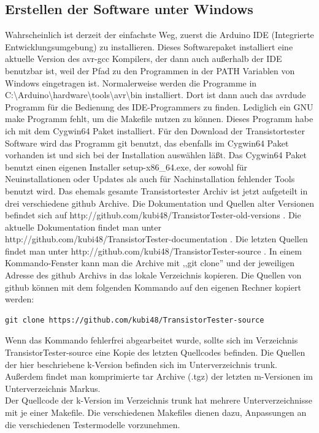 \subsection{Erstellen der Software unter Windows}
Wahrscheinlich ist derzeit der einfachste Weg, zuerst die Arduino IDE (Integrierte Entwicklungsumgebung) zu installieren.
Dieses Softwarepaket installiert eine aktuelle Version des avr-gcc Kompilers, der dann
auch außerhalb der IDE benutzbar ist, weil der Pfad zu den Programmen in der PATH Variablen von Windows eingetragen ist.
Normalerweise werden die Programme in C:\textbackslash Arduino\textbackslash hardware\textbackslash tools\textbackslash avr\textbackslash bin installiert.
Dort ist dann auch das avrdude Programm für die Bedienung des IDE-Programmers zu finden.
Lediglich ein GNU make Programm fehlt, um die Makefile nutzen zu können.
Dieses Programm habe ich mit dem Cygwin64 Paket installiert.
Für den Download der Transistortester Software wird das Programm git benutzt,
das ebenfalls im Cygwin64 Paket vorhanden ist und sich bei der Installation auswählen läßt.
Das Cygwin64 Paket benutzt einen eigenen Installer setup-x86\_64.exe, der sowohl für Neuinstallationen oder Updates als
auch für Nachinstallation fehlender Tools benutzt wird.
Das ehemals gesamte Transistortester Archiv ist jetzt aufgeteilt in drei verschiedene github Archive.
Die Dokumentation und Quellen alter Versionen befindet sich auf http://github.com/kubi48/TransistorTester-old-versions .
Die aktuelle Dokumentation findet man unter http://github.com/kubi48/TransistorTester-documentation .
Die letzten Quellen findet man unter http://github.com/kubi48/TransistorTester-source .
In einem Kommando-Fenster kann man die Archive mit ,,git clone'' und der jeweiligen Adresse des github Archivs in das lokale
Verzeichnis kopieren.
Die Quellen von github können mit dem folgenden Kommando auf den eigenen Rechner kopiert werden:
\begin{verbatim}
git clone https://github.com/kubi48/TransistorTester-source
\end{verbatim}
Wenn das Kommando fehlerfrei abgearbeitet wurde, sollte sich im
Verzeichnis TransistorTester-source eine Kopie des letzten Quellcodes befinden.  
Die Quellen der hier beschriebene k-Version  befinden sich im Unterverzeichnis trunk.
Außerdem findet man komprimierte tar Archive (.tgz) der letzten m-Versionen im
Unterverzeichnis Markus.\\
Der Quellcode der k-Version im Verzeichnis trunk hat mehrere Unterverzeichnisse mit je einer Makefile.
Die verschiedenen Makefiles dienen dazu, Anpassungen an die verschiedenen Testermodelle vorzunehmen.
